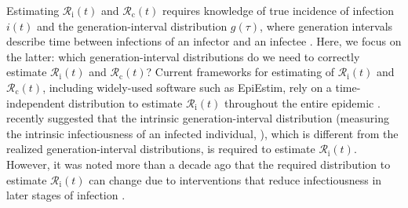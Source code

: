 \documentclass[12pt]{article}
\newcommand{\Rx}[1]{\ensuremath{{\mathcal R}_{#1}}\xspace}
\newcommand{\Rc}{\Rx{\mathrm{c}}}
\newcommand{\Ri}{\Rx{\mathrm{i}}}
\begin{document}
Estimating $\Ri(t)$ and $\Rc(t)$ requires knowledge of true incidence of infection $i(t)$ and the generation-interval distribution $g(\tau)$, where generation intervals describe time between infections of an infector and an infectee \citep{svensson2007note}.
Here, we focus on the latter: which generation-interval distributions do we need to correctly estimate $\Ri(t)$ and $\Rc(t)$?
Current frameworks for estimating of $\Ri(t)$ and $\Rc(t)$, including widely-used software such as EpiEstim, rely on a time-independent distribution to estimate $\Ri(t)$ throughout the entire epidemic \citep{cori2013new}.
\cite{gostic2020practical} recently suggested that the intrinsic generation-interval distribution (measuring the intrinsic infectiousness of an infected individual, \cite{champredon2015intrinsic}), which is different from the realized generation-interval distributions, is required to estimate $\Ri(t)$.
However, it was noted more than a decade ago that the required distribution to estimate $\Ri(t)$ can change due to interventions that reduce infectiousness in later stages of infection \citep{fraser2007estimating}.
\end{document}
